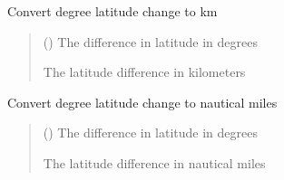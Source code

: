 \documentclass[letterpaper,10pt,english]{sphinxmanual}
\begin{document}

\begin{fulllineitems}
\label{\detokenize{misc:glomar_gridding.utils.deg_to_km}}
\pysigstartsignatures
\pysiglinewithargsret
{}
{}
{}
\pysigstopsignatures
\sphinxAtStartPar
Convert degree latitude change to km
\begin{quote}\begin{description}
\sphinxAtStartPar
{} () \textendash{} The difference in latitude in degrees

\sphinxAtStartPar
The latitude difference in kilometers

\sphinxAtStartPar
{}

\end{description}\end{quote}

\end{fulllineitems}


\begin{fulllineitems}
\label{\detokenize{misc:glomar_gridding.utils.deg_to_nm}}
\pysigstartsignatures
\pysiglinewithargsret
{}
{}
{}
\pysigstopsignatures
\sphinxAtStartPar
Convert degree latitude change to nautical miles
\begin{quote}\begin{description}
\sphinxAtStartPar
{} () \textendash{} The difference in latitude in degrees

\sphinxAtStartPar
The latitude difference in nautical miles

\sphinxAtStartPar
{}

\end{description}\end{quote}

\end{fulllineitems}
\end{document}
